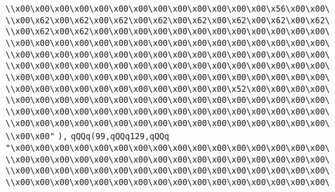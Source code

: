 \verb|\\x00\x00\x00\x00\x00\x00\x00\x00\x00\x00\x00\x00\x00\x56\x00\x00\|\newline
\verb|\\x00\x62\x00\x62\x00\x62\x00\x62\x00\x62\x00\x62\x00\x62\x00\x62\|\newline
\verb|\\x00\x62\x00\x62\x00\x00\x00\x00\x00\x00\x00\x00\x00\x00\x00\x00\|\newline
\verb|\\x00\x00\x00\x00\x00\x00\x00\x00\x00\x00\x00\x00\x00\x00\x00\x00\|\newline
\verb|\\x00\x00\x00\x00\x00\x00\x00\x00\x00\x00\x00\x00\x00\x00\x00\x00\|\newline
\verb|\\x00\x00\x00\x00\x00\x00\x00\x00\x00\x00\x00\x00\x00\x00\x00\x00\|\newline
\verb|\\x00\x00\x00\x00\x00\x00\x00\x00\x00\x00\x00\x00\x00\x00\x00\x00\|\newline
\verb|\\x00\x00\x00\x00\x00\x00\x00\x00\x00\x00\x00\x52\x00\x00\x00\x00\|\newline
\verb|\\x00\x00\x00\x00\x00\x00\x00\x00\x00\x00\x00\x00\x00\x00\x00\x00\|\newline
\verb|\\x00\x00\x00\x00\x00\x00\x00\x00\x00\x00\x00\x00\x00\x00\x00\x00\|\newline
\verb|\\x00\x00\x00\x00\x00\x00\x00\x00\x00\x00\x00\x00\x00\x00\x00\x00\|\newline
\verb|\\x00\x00"|\newline
\verb|),|\newline
\verb|qQQq(99,qQQq129,qQQq|\newline
\verb|"\x00\x00\x00\x00\x00\x00\x00\x00\x00\x00\x00\x00\x00\x00\x00\x00\|\newline
\verb|\\x00\x00\x00\x00\x00\x00\x00\x00\x00\x00\x00\x00\x00\x00\x00\x00\|\newline
\verb|\\x00\x00\x00\x00\x00\x00\x00\x00\x00\x00\x00\x00\x00\x00\x00\x00\|\newline
\verb|\\x00\x00\x00\x00\x00\x00\x00\x00\x00\x00\x00\x00\x00\x00\x00\x00\|\newline
